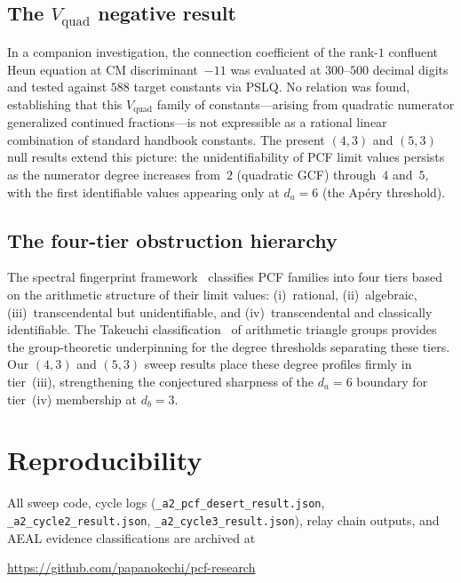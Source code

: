 \documentclass[11pt]{amsart}
\theoremstyle{plain}
\theoremstyle{remark}
\begin{document}
\subsection{The $V_{\mathrm{quad}}$ negative result}
In a companion investigation, the connection coefficient
of the rank-$1$ confluent Heun equation at CM discriminant~$-11$
was evaluated at $300$--$500$ decimal digits and tested against
$588$ target constants via PSLQ.
No relation was found, establishing that this
$V_{\mathrm{quad}}$ family of constants---arising from quadratic
numerator generalized continued fractions---is not expressible as a
rational linear combination of standard handbook constants.
The present $(4,3)$ and $(5,3)$ null results extend this picture:
the unidentifiability of PCF limit values persists as the numerator
degree increases from~$2$ (quadratic GCF) through~$4$ and~$5$,
with the first identifiable values appearing only at $d_a = 6$
(the Ap\'ery threshold).

\subsection{The four-tier obstruction hierarchy}
The spectral fingerprint framework~\cite{spectral} classifies PCF
families into four tiers based on the arithmetic structure of
their limit values:
(i)~rational,
(ii)~algebraic,
(iii)~transcendental but unidentifiable,
and (iv)~transcendental and classically identifiable.
The Takeuchi classification~\cite{takeuchi1977} of arithmetic
triangle groups provides the group-theoretic underpinning for
the degree thresholds separating these tiers.
Our $(4,3)$ and $(5,3)$ sweep results place these degree
profiles firmly in tier~(iii), strengthening the conjectured
sharpness of the $d_a = 6$ boundary for tier~(iv) membership
at $d_b = 3$.

\section{Reproducibility}\label{sec:repro}

All sweep code, cycle logs
(\texttt{\_a2\_pcf\_desert\_result.json},
\texttt{\_a2\_cycle2\_result.json},
\texttt{\_a2\_cycle3\_result.json}),
relay chain outputs, and AEAL evidence classifications
are archived at
\begin{center}
  \url{https://github.com/papanokechi/pcf-research}
\end{center}
\end{document}
